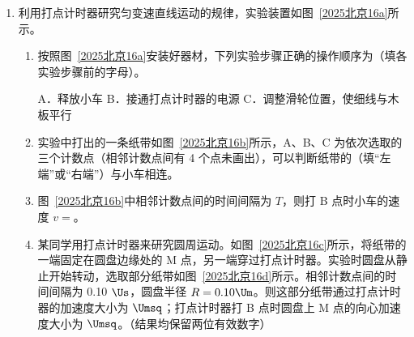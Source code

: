 \documentclass[\gkver]{gaokaozhenti}
\begin{document}
\begin{enumerate}
{故选 C。
}

\item
利用打点计时器研究匀变速直线运动的规律，实验装置如图~\ref{2025北京16a}所示。


\begin{enumerate}
	\item
	按照图~\ref{2025北京16a}安装好器材，下列实验步骤正确的操作顺序为（填各实验步骤前的字母）。

	A．释放小车 \qquad B．接通打点计时器的电源 \qquad C．调整滑轮位置，使细线与木板平行
	\item
	实验中打出的一条纸带如图~\ref{2025北京16b}所示，A、B、C 为依次选取的三个计数点（相邻计数点间有 4 个点未画出），可以判断纸带的（填“左端”或“右端”）与小车相连。
	\item
	图~\ref{2025北京16b}中相邻计数点间的时间间隔为 $T$，则打 B 点时小车的速度 $v = $。
	\item
	某同学用打点计时器来研究圆周运动。如图~\ref{2025北京16c}所示，将纸带的一端固定在圆盘边缘处的 M 点，另一端穿过打点计时器。实验时圆盘从静止开始转动，选取部分纸带如图~\ref{2025北京16d}所示。相邻计数点间的时间间隔为 0.10 $\Us$，圆盘半径 $R = 0.10 \Um$。则这部分纸带通过打点计时器的加速度大小为 $\Umsq$；打点计时器打 B 点时圆盘上 M 点的向心加速度大小为 $\Umsq$。（结果均保留两位有效数字）

\end{enumerate}

\end{enumerate}
\end{document}
